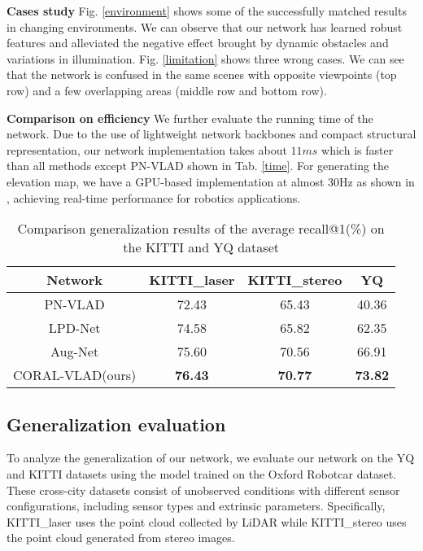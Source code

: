 \documentclass[letterpaper, 10 pt, conference]{ieeeconf}  \usepackage{tabularx}
\begin{document}
\textbf{Cases study} Fig. \ref{environment} shows some of the successfully matched results in changing environments. We can observe that our network has learned robust features and alleviated the negative effect brought by dynamic obstacles and variations in illumination. Fig. \ref{limitation} shows three wrong cases. We can see that the network is confused in the same scenes with opposite viewpoints (top row) and a few overlapping areas (middle row and bottom row).


\textbf{Comparison on efficiency} We further evaluate the running time of the network. Due to the use of lightweight network backbones and compact structural representation, our network implementation takes about $11ms$ which is faster than all methods except PN-VLAD shown in Tab. \ref{time}. For generating the elevation map, we have a GPU-based implementation at almost 30Hz as shown in \cite{pan2019gpu}, achieving real-time performance for robotics applications.  


\begin{center}
	\begin{table}[tp]
		\vspace{1.5mm}
		\caption{Comparison generalization results of the average recall@1(\%) on the KITTI and YQ dataset}
		\centering
		\linespread{1.1}\selectfont
		\begin{tabularx}{7.9cm}{c|c|c|c}
			\toprule[1.5pt]
			Network& KITTI\_laser & KITTI\_stereo & YQ \\
			\hline
			PN-VLAD& 72.43 &65.43 & 40.36 \\[1pt]
			LPD-Net & 74.58 & 65.82 & 62.35 \\[1pt]
			Aug-Net&75.60 &70.56 & 66.91 \\[1pt]
			\hline
			CORAL-VLAD(ours)& \textbf{76.43} & \textbf{70.77} & \textbf{73.82}  \\[1pt]
			\toprule[1.5pt]
		\end{tabularx}
		
		\label{Generalizability}
	\vspace{-10pt}	
	\end{table}
\end{center}

\subsection{Generalization evaluation}

To analyze the generalization of our network, we evaluate our network on the YQ and KITTI datasets using the model trained on the Oxford Robotcar dataset. These cross-city datasets consist of unobserved conditions with different sensor configurations, including sensor types and extrinsic parameters. Specifically, KITTI\_laser uses the point cloud collected by LiDAR while KITTI\_stereo uses the point cloud generated from stereo images.  
\end{document}

